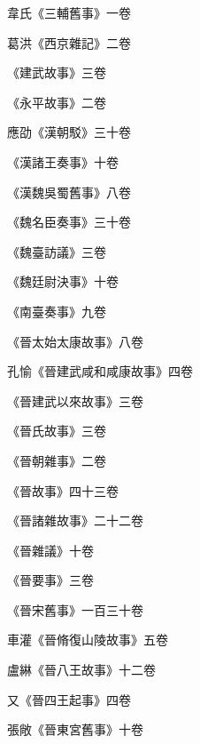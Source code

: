 \begin{pinyinscope}
 韋氏《三輔舊事》一卷



 葛洪《西京雜記》二卷



 《建武故事》三卷



 《永平故事》二卷



 應劭《漢朝駁》三十卷



 《漢諸王奏事》十卷



 《漢魏吳蜀舊事》八卷



 《魏名臣奏事》三十卷



 《魏臺訪議》三卷



 《魏廷尉決事》十卷



 《南臺奏事》九卷



 《晉太始太康故事》八卷



 孔愉《晉建武咸和咸康故事》四卷



 《晉建武以來故事》三卷



 《晉氏故事》三卷



 《晉朝雜事》二卷



 《晉故事》四十三卷



 《晉諸雜故事》二十二卷



 《晉雜議》十卷



 《晉要事》三卷



 《晉宋舊事》一百三十卷



 車灌《晉脩復山陵故事》五卷



 盧綝《晉八王故事》十二卷



 又《晉四王起事》四卷



 張敞《晉東宮舊事》十卷




\end{pinyinscope}
